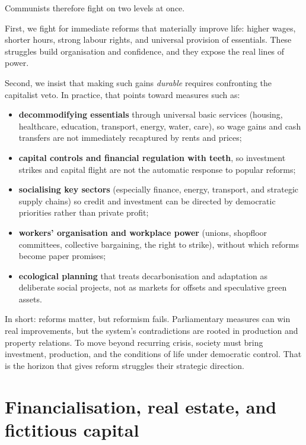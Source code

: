 Communists therefore fight on two levels at once.

First, we fight for immediate reforms that materially improve life: higher wages, shorter hours, strong labour rights, and
universal provision of essentials. These struggles build organisation and confidence, and they expose the real lines of power.

Second, we insist that making such gains \emph{durable} requires confronting the capitalist veto. In practice, that points
toward measures such as:

\begin{itemize}[leftmargin=1.5em]
  \item \textbf{decommodifying essentials} through universal basic services (housing, healthcare, education, transport, energy,
  water, care), so wage gains and cash transfers are not immediately recaptured by rents and prices;
  \item \textbf{capital controls and financial regulation with teeth}, so investment strikes and capital flight are not the
  automatic response to popular reforms;
  \item \textbf{socialising key sectors} (especially finance, energy, transport, and strategic supply chains) so credit and
  investment can be directed by democratic priorities rather than private profit;
  \item \textbf{workers' organisation and workplace power} (unions, shopfloor committees, collective bargaining, the right to
  strike), without which reforms become paper promises;
  \item \textbf{ecological planning} that treats decarbonisation and adaptation as deliberate social projects, not as markets
  for offsets and speculative green assets.
\end{itemize}

In short: reforms matter, but reformism fails. Parliamentary measures can win real improvements, but the system's contradictions
are rooted in production and property relations. To move beyond recurring crisis, society must bring investment, production, and
the conditions of life under democratic control. That is the horizon that gives reform struggles their strategic direction.

\section{Financialisation, real estate, and fictitious capital}
\label{sec:financialisation}


